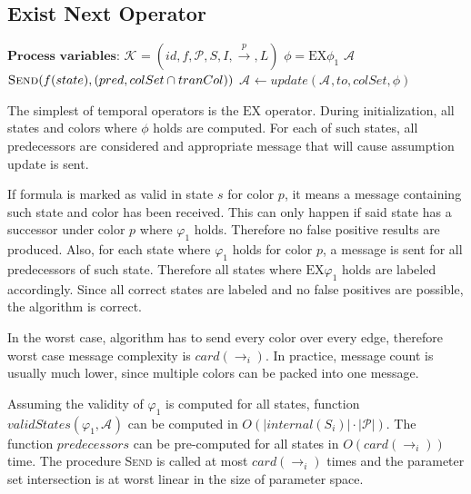 \documentclass[12pt,oneside,draft]{fithesis2}
\newcommand{\as}[1][]{\ensuremath{\mathcal{A}_{#1}}}
\newcommand{\method}[1]{\textnormal{\textsc{#1}}}
\newcommand{\ks}[1][]{\ensuremath{\mathcal{K}_{#1}}}
\newcommand{\trans}[1]{\stackrel{#1}{\rightarrow}}
\newcommand{\params}{\mathcal{P}}
\newcommand{\ex}[1]{\ensuremath{\mbox{EX} #1}}
\begin{document}
	   		\subsection{Exist Next Operator}
   			   			
				\begin{algorithmic}[1]
				\State $ \textbf{Process variables:} $
				\State $ \ks = (id, f, \mathcal{P}, S, I, \trans{p}, L) $ 
				\State $ \phi = \ex{\phi_1}  $ 
				\State $ \as $ 
					\ForAll {$(state, colSet)$ \textbf{in} $ validStates(\phi_1, \as) $}
							\State $ \Call{Send}{f(state), (pred, colSet \cap tranCol)} $
						\EndFor
					\EndFor
				\EndProcedure
					\State $ \as \gets update(\as, to, colSet, \phi)$
				\EndProcedure
				\end{algorithmic}	
				
				The simplest of temporal operators is the \ex{} operator. During initialization, all states and colors where $\phi$ holds are computed. For each of such states, all predecessors are considered and appropriate message that will cause assumption update is sent.
				
				If formula is marked as valid in state $s$ for color $p$, it means a message containing such state and color has been received. This can only happen if said state has a successor under color $p$ where $\varphi_1$ holds. Therefore no false positive results are produced. Also, for each state where $\varphi_1$ holds for color $p$, a message is sent for all predecessors of such state. Therefore all states where $\ex{\varphi_1}$ holds are labeled accordingly. Since all correct states are labeled and no false positives are possible, the algorithm is correct.
				
				In the worst case, algorithm has to send every color over every edge, therefore worst case message complexity is $card(\trans{}_{i})$. In practice, message count is usually much lower, since multiple colors can be packed into one message.
				
				Assuming the validity of $\varphi_1$ is computed for all states, function $validStates(\varphi_1, \as)$ can be computed in $O(|internal(S_{i})| \cdot |\params|)$. The function $predecessors$ can be pre-computed for all states in $O(card(\trans{}_{i}))$ time. The procedure \method{Send} is called at most $card(\trans{}_{i})$ times and the parameter set intersection is at worst linear in the size of parameter space. 
				
\end{document}
